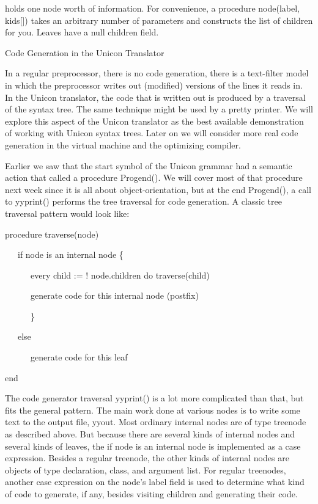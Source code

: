 \noindent holds one node worth of information. For convenience, a
procedure node(label, kids[]) takes an arbitrary number of parameters
and constructs the list of children for you. Leaves have a null
children field.

{\sffamily
{\textquotedbl}Code Generation{\textquotedbl} in the Unicon Translator }

In a regular preprocessor, there is no code generation, there is a
text-filter model in which the preprocessor writes out (modified)
versions of the lines it reads in. In the Unicon translator, the code
that is written out is produced by a traversal of the syntax tree. The
same technique might be used by a {\textquotedbl}pretty
printer{\textquotedbl}. We will explore this aspect of the Unicon
translator as the best available demonstration of working with Unicon
syntax trees. Later on we will consider more
{\textquotedbl}real{\textquotedbl} code generation in the virtual
machine and the optimizing compiler.

Earlier we saw that the start symbol of the Unicon grammar had a
semantic action that called a procedure Progend(). We will cover most
of that procedure next week since it is all about object-orientation,
but at the end Progend(), a call to yyprint() performs the tree
traversal for code generation. A classic tree traversal pattern would
look like:

{\ttfamily\mdseries
procedure traverse(node)}

{\ttfamily\mdseries
\ \ \ if node is an internal node \{}

{\ttfamily\mdseries
\ \ \ \ \ \ every child := ! node.children do traverse(child)}

{\ttfamily\mdseries
\ \ \ \ \ \ generate code for this internal node (postfix)}

{\ttfamily\mdseries
\ \ \ \ \ \ \}}

{\ttfamily\mdseries
\ \ \ else}

{\ttfamily\mdseries
\ \ \ \ \ \ generate code for this leaf}

{\ttfamily\mdseries
end}

The code generator traversal yyprint() is a lot more complicated than
that, but fits the general pattern. The main work done at various
nodes is to write some text to the output file, yyout. Most ordinary
internal nodes are of type treenode as described above. But because
there are several kinds of internal nodes and several kinds of leaves,
the {\textquotedbl}if node is an internal node{\textquotedbl} is
implemented as a case expression. Besides a regular treenode, the
other kinds of internal nodes are objects of type declaration, class,
and argument list. For regular treenodes, another case expression on
the node's label field is used to determine what kind of code to
generate, if any, besides visiting children and generating their code.

